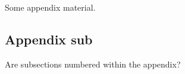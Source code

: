 \documentclass[heading.tex]{subfiles}
\begin{document}
\newpage
\appendix

Some appendix material.

\subsection{Appendix sub}
Are subsections numbered within the appendix?


\end{document}
